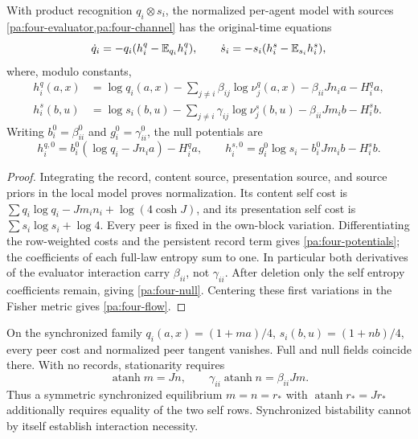 With product recognition $q_i\otimes s_i$, the normalized per-agent model with sources \cref{pa:four-evaluator,pa:four-channel} has the original-time equations
\begin{equation}
 \dot q_i=-q_i(h_i^q-\mathbb E_{q_i}h_i^q),\qquad
 \dot s_i=-s_i(h_i^s-\mathbb E_{s_i}h_i^s),
 \label{pa:four-flow}
\end{equation}
where, modulo constants,
\begin{equation}
 \begin{aligned}
 h_i^q(a,x)&=\log q_i(a,x)-\sum_{j\ne i}\beta_{ij}\log\nu_j^q(a,x)
             -\beta_{ii}Jn_i a-H_i^q a,\\
 h_i^s(b,u)&=\log s_i(b,u)-\sum_{j\ne i}\gamma_{ij}\log\nu_j^s(b,u)
             -\beta_{ii}Jm_i b-H_i^s b.
 \end{aligned}
 \label{pa:four-potentials}
\end{equation}
Writing $b_i^0=\beta^0_{ii}$ and $g_i^0=\gamma^0_{ii}$, the null potentials are
\begin{equation}
 h_i^{q,0}=b_i^0(\log q_i-Jn_i a)-H_i^q a,\qquad
 h_i^{s,0}=g_i^0\log s_i-b_i^0Jm_i b-H_i^s b.
 \label{pa:four-null}
\end{equation}
\begin{proof}
Integrating the record, content source, presentation source, and source priors in the local model proves normalization. Its content self cost is
$\sum q_i\log q_i-Jm_in_i+\log(4\cosh J)$, and its presentation self cost is $\sum s_i\log s_i+\log4$. Every peer is fixed in the own-block variation. Differentiating the row-weighted costs and the persistent record term gives \cref{pa:four-potentials}; the coefficients of each full-law entropy sum to one. In particular both derivatives of the evaluator interaction carry $\beta_{ii}$, not $\gamma_{ii}$. After deletion only the self entropy coefficients remain, giving \cref{pa:four-null}. Centering these first variations in the Fisher metric gives \cref{pa:four-flow}.
\end{proof}

On the synchronized family $q_i(a,x)=(1+ma)/4$, $s_i(b,u)=(1+nb)/4$, every peer cost and normalized peer tangent vanishes. Full and null fields coincide there. With no records, stationarity requires
\begin{equation}
 \operatorname{atanh}m=Jn,\qquad
 \gamma_{ii}\operatorname{atanh}n=\beta_{ii}Jm.
 \label{pa:four-stationarity}
\end{equation}
Thus a symmetric synchronized equilibrium $m=n=r_*$ with $\operatorname{atanh}r_*=Jr_*$ additionally requires equality of the two self rows. Synchronized bistability cannot by itself establish interaction necessity.

